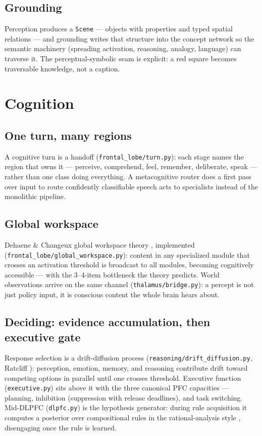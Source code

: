 \documentclass[11pt]{article}
\newcommand{\code}[1]{\texttt{\small #1}}
\begin{document}
\subsection{Grounding}

Perception produces a \code{Scene} --- objects with properties and
typed spatial relations --- and grounding writes that structure into
the concept network so the semantic machinery (spreading activation,
reasoning, analogy, language) can traverse it. The perceptual-symbolic
seam is explicit: a red square becomes traversable knowledge, not a
caption.

\section{Cognition}

\subsection{One turn, many regions}

A cognitive turn is a handoff (\code{frontal\_lobe/turn.py}): each stage
names the region that owns it --- perceive, comprehend, feel, remember,
deliberate, speak --- rather than one class doing everything. A
metacognitive router does a first pass over input to route confidently
classifiable speech acts to specialists instead of the monolithic
pipeline.

\subsection{Global workspace}

Dehaene \& Changeux global workspace theory \cite{dehaene}, implemented
(\code{frontal\_lobe/global\_workspace.py}): content in any specialized
module that crosses an activation threshold is broadcast to all
modules, becoming cognitively accessible --- with the 3--4-item
bottleneck the theory predicts. World observations arrive on the same
channel (\code{thalamus/bridge.py}): a percept is not just policy input,
it is conscious content the whole brain hears about.

\subsection{Deciding: evidence accumulation, then executive gate}

Response selection is a drift-diffusion process
(\code{reasoning/drift\_diffusion.py}, Ratcliff \cite{ratcliff}): perception, emotion,
memory, and reasoning contribute drift toward competing options in
parallel until one crosses threshold. Executive function
(\code{executive.py}) sits above it with the three canonical PFC
capacities --- planning, inhibition (suppression with release
deadlines), and task switching. Mid-DLPFC (\code{dlpfc.py}) is the hypothesis
generator: during rule acquisition it computes a posterior over
compositional rules in the rational-analysis style
\cite{goodman,crescentini}, disengaging once
the rule is learned.
\end{document}
